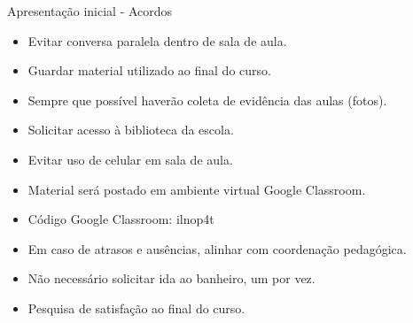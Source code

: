 
\begin{frame}{Apresentação inicial - Acordos}
    \begin{itemize}
        \item Evitar conversa paralela dentro de sala de aula.
        \item Guardar material utilizado ao final do curso.
        \item Sempre que possível haverão coleta de evidência das aulas (fotos).
        \item Solicitar acesso à biblioteca da escola.
        \item Evitar uso de celular em sala de aula.
        \item Material será postado em ambiente virtual Google Classroom.
        \item Código Google Classroom: ilnop4t
        \item Em caso de atrasos e ausências, alinhar com coordenação pedagógica.
        \item Não necessário solicitar ida ao banheiro, um por vez.
        \item Pesquisa de satisfação ao final do curso.
    \end{itemize}
\end{frame}
